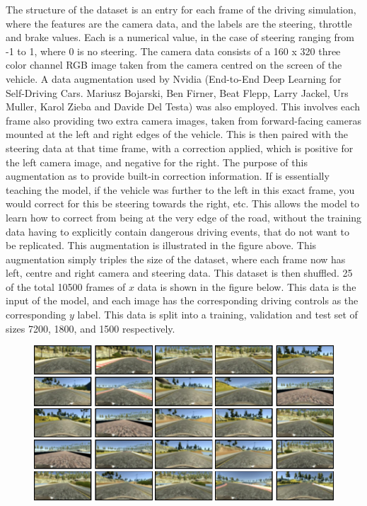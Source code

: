 \documentclass[letterpaper,12pt]{article}
\begin{document}
\FloatBarrier
The structure of the dataset is an entry for each frame of the driving simulation, where the features are the camera data, and the labels are the steering, throttle and brake values. Each is a numerical value, in the case of steering ranging from -1 to 1, where 0 is no steering. The camera data consists of a 160 x 320 three color channel RGB image taken from the camera centred on the screen of the vehicle. A data augmentation used by Nvidia (End-to-End Deep Learning for Self-Driving Cars. Mariusz Bojarski, Ben Firner, Beat Flepp, Larry Jackel, Urs Muller, Karol Zieba and Davide Del Testa) was also employed. This involves each frame also providing two extra camera images, taken from forward-facing cameras mounted at the left and right edges of the vehicle. This is then paired with the steering data at that time frame, with a correction applied, which is positive for the left camera image, and negative for the right. The purpose of this augmentation as to provide built-in correction information. If is essentially teaching the model, if the vehicle was further to the left in this exact frame, you would correct for this be steering towards the right, etc. This allows the model to learn how to correct from being at the very edge of the road, without the training data having to explicitly contain dangerous driving events, that do not want to be replicated. This augmentation is illustrated in the figure above. This augmentation simply triples the size of the dataset, where each frame now has left, centre and right camera and steering data. This dataset is then shuffled. 25 of the total 10500 frames of $x$ data is shown in the figure below. This data is the input of the model, and each image has the corresponding driving controls as the corresponding $y$ label. This data is split into a training, validation and test set of sizes 7200, 1800, and 1500 respectively. 
\FloatBarrier
\begin{figure}
\centering
\includegraphics[scale=1.5]{../results/preproc_clean.pdf}
\end{figure}
\FloatBarrier
\end{document}
